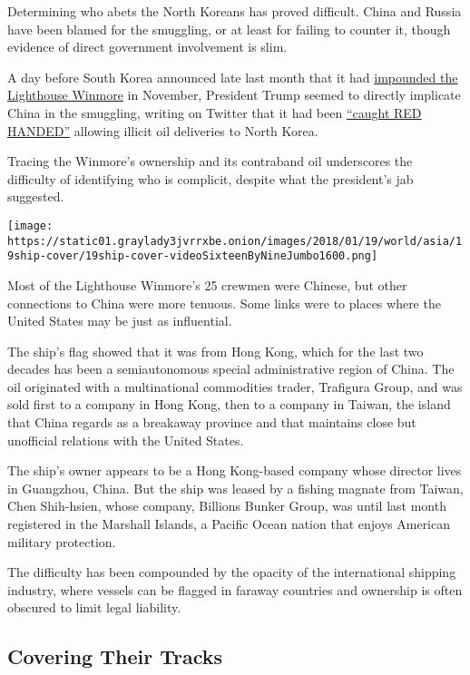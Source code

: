 Determining who abets the North Koreans has proved difficult. China and
Russia have been blamed for the smuggling, or at least for failing to
counter it, though evidence of direct government involvement is slim.

A day before South Korea announced late last month that it had
\href{https://www.nytimes3xbfgragh.onion/2017/12/29/world/asia/south-korea-ship-seized.html}{impounded
the Lighthouse Winmore} in November, President Trump seemed to directly
implicate China in the smuggling, writing on Twitter that it had been
\href{https://twitter.com/realDonaldTrump/status/946416486054285314}{``caught
RED HANDED''} allowing illicit oil deliveries to North Korea.

Tracing the Winmore's ownership and its contraband oil underscores the
difficulty of identifying who is complicit, despite what the president's
jab suggested.

\texttt{[image: https://static01.graylady3jvrrxbe.onion/images/2018/01/19/world/asia/19ship-cover/19ship-cover-videoSixteenByNineJumbo1600.png]}

Most of the Lighthouse Winmore's 25 crewmen were Chinese, but other
connections to China were more tenuous. Some links were to places where
the United States may be just as influential.

The ship's flag showed that it was from Hong Kong, which for the last
two decades has been a semiautonomous special administrative region of
China. The oil originated with a multinational commodities trader,
Trafigura Group, and was sold first to a company in Hong Kong, then to a
company in Taiwan, the island that China regards as a breakaway province
and that maintains close but unofficial relations with the United
States.

The ship's owner appears to be a Hong Kong-based company whose director
lives in Guangzhou, China. But the ship was leased by a fishing magnate
from Taiwan, Chen Shih-hsien, whose company, Billions Bunker Group, was
until last month registered in the Marshall Islands, a Pacific Ocean
nation that enjoys American military protection.

The difficulty has been compounded by the opacity of the international
shipping industry, where vessels can be flagged in faraway countries and
ownership is often obscured to limit legal liability.

\hypertarget{covering-their-tracks}{%
\subsection{Covering Their Tracks}\label{covering-their-tracks}}

